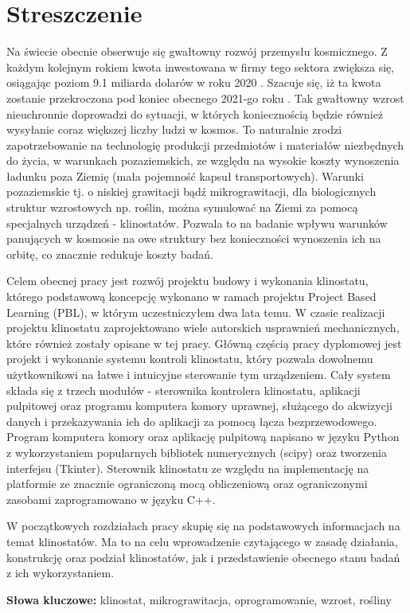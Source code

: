 \chapter*{Streszczenie}

Na świecie obecnie obserwuje się gwałtowny rozwój przemysłu kosmicznego. Z każdym kolejnym
 rokiem kwota inwestowana w firmy tego sektora zwiększa się, osiągając poziom 9.1 miliarda
  dolarów w roku 2020 \cite{bib:kosmos_raport_kwartalny_2021}. Szacuje się, iż ta kwota
   zostanie przekroczona pod koniec obecnego 2021-go roku
    \cite{bib:kosmos_raport_kwartalny_2021}. Tak gwałtowny wzrost nieuchronnie doprowadzi do
     sytuacji, w których koniecznością będzie również wysyłanie coraz większej liczby ludzi
      w kosmos. To naturalnie zrodzi zapotrzebowanie na technologię produkcji przedmiotów i
       materiałów niezbędnych do życia, w warunkach pozaziemskich, ze względu na wysokie
        koszty wynoszenia ładunku poza Ziemię (mała pojemność kapsuł transportowych).
         Warunki pozaziemskie tj. o niskiej grawitacji bądź mikrograwitacji, dla
          biologicznych struktur wzrostowych np. roślin, można symulować na Ziemi za pomocą
           specjalnych urządzeń - klinostatów. Pozwala to na badanie wpływu warunków
            panujących w kosmosie na owe struktury bez konieczności wynoszenia ich na
             orbitę, co znacznie redukuje koszty badań.  

Celem obecnej pracy jest rozwój projektu budowy i wykonania klinostatu, którego podstawową
 koncepcję wykonano w ramach projektu Project Based Learning (PBL), w którym uczestniczyłem
  dwa lata temu. W czasie realizacji projektu klinostatu zaprojektowano wiele autorskich
   usprawnień mechanicznych, które również zostały opisane w tej pracy. Główną częścią pracy
    dyplomowej jest projekt i wykonanie systemu kontroli klinostatu, który pozwala dowolnemu
     użytkownikowi na łatwe i intuicyjne sterowanie tym urządzeniem. Cały system składa się
      z trzech modułów - sterownika kontrolera klinostatu, aplikacji pulpitowej oraz
       programu komputera komory uprawnej, służącego do akwizycji danych i przekazywania ich
        do aplikacji za pomocą łącza bezprzewodowego. Program komputera komory oraz
         aplikację pulpitową napisano w języku Python z wykorzystaniem popularnych bibliotek
          numerycznych (scipy) oraz tworzenia interfejsu (Tkinter). Sterownik klinostatu ze
           względu na implementację na platformie ze znacznie ograniczoną mocą obliczeniową
            oraz ograniczonymi zasobami zaprogramowano w języku C++. 

W początkowych rozdziałach pracy skupię się na podstawowych informacjach na temat
 klinostatów. Ma to na celu wprowadzenie czytającego w zasadę działania, konstrukcję oraz
  podział klinostatów, jak i przedstawienie obecnego stanu badań z ich wykorzystaniem. 
  

{\bf Słowa kluczowe:} klinostat, mikrograwitacja, oprogramowanie, wzrost, rośliny


